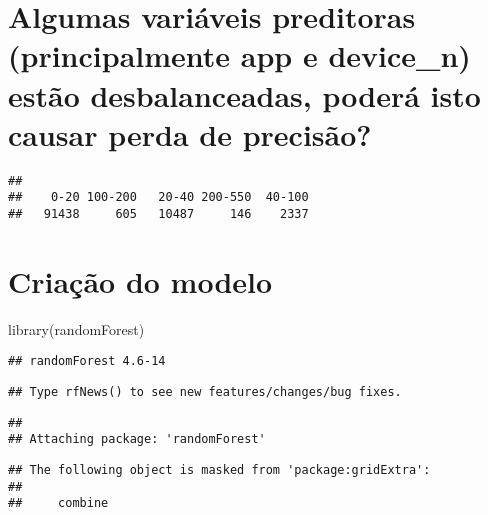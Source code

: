\documentclass[
]{article}
\newenvironment{Shaded}{\begin{snugshade}}{\end{snugshade}}
\newcommand{\FunctionTok}[1]{\textcolor[rgb]{0.00,0.00,0.00}{#1}}
\newcommand{\NormalTok}[1]{#1}
\newcommand{\SpecialCharTok}[1]{\textcolor[rgb]{0.00,0.00,0.00}{#1}}
\begin{document}
\hypertarget{algumas-variuxe1veis-preditoras-principalmente-app-e-device_n-estuxe3o-desbalanceadas-poderuxe1-isto-causar-perda-de-precisuxe3o}{%
\section{Algumas variáveis preditoras (principalmente app e device\_n)
estão desbalanceadas, poderá isto causar perda de
precisão?}\label{algumas-variuxe1veis-preditoras-principalmente-app-e-device_n-estuxe3o-desbalanceadas-poderuxe1-isto-causar-perda-de-precisuxe3o}}

\begin{Shaded}
\end{Shaded}

\begin{verbatim}
## 
##    0-20 100-200   20-40 200-550  40-100 
##   91438     605   10487     146    2337
\end{verbatim}

\hypertarget{criauxe7uxe3o-do-modelo}{%
\section{Criação do modelo}\label{criauxe7uxe3o-do-modelo}}

\begin{Shaded}
\begin{Highlighting}[]
\FunctionTok{library}\NormalTok{(randomForest)}
\end{Highlighting}
\end{Shaded}

\begin{verbatim}
## randomForest 4.6-14
\end{verbatim}

\begin{verbatim}
## Type rfNews() to see new features/changes/bug fixes.
\end{verbatim}

\begin{verbatim}
## 
## Attaching package: 'randomForest'
\end{verbatim}

\begin{verbatim}
## The following object is masked from 'package:gridExtra':
## 
##     combine
\end{verbatim}
\end{document}
